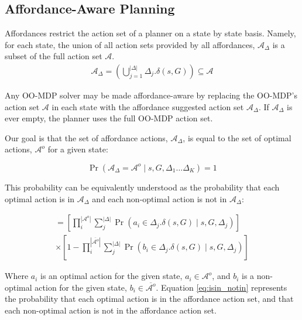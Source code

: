 \documentclass[conference]{IEEEtran}
\begin{document}
\subsection{Affordance-Aware Planning}
Affordances restrict the action set of a planner on a state by state basis. Namely, for each state, the union of all action sets provided by all affordances, $\mathcal{A}_{\Delta}$ is a subset of the full action set $\mathcal{A}$. 
\begin{align}
\mathcal{A}_{\Delta} = \left(\bigcup\limits_{j = 1}^{|\Delta|} \Delta_j.\delta(s,G) \right) \subseteq \mathcal{A}
\label{eq:afford_union}
\end{align}

Any OO-MDP solver may be made affordance-aware by replacing the OO-MDP's action set $\mathcal{A}$ in each state with the affordance suggested action set $\mathcal{A}_\Delta$. If $\mathcal{A}_\Delta$ is ever empty, the planner uses the full OO-MDP action set.

Our goal is that the set of affordance actions, $\mathcal{A}_{\Delta}$, is equal to the set of optimal actions, $\mathcal{A}^o$ for a given state:

\begin{equation} 
\Pr( \mathcal{A}_{\Delta} = \mathcal{A}^o \mid s, G, \Delta_1 \dots \Delta_K) = 1
\label{eq:opt}
\end{equation}

This probability can be equivalently understood as the probability that each
optimal action is in $\mathcal{A}_{\Delta}$ and each non-optimal action is not in $\mathcal{A}_{\Delta}$: %

\begin{multline}
= \left[\prod_i^{|\mathcal{A}^o|} \sum_j^{|\Delta|} \Pr(a_i \in \Delta_j.\delta(s,G) \mid s, G, \Delta_j)\right] \\
\times \left[1 - \prod_i^{|\overline{\mathcal{A}^o}|} \sum_j^{|\Delta|} \Pr(b_i \in \Delta_j.\delta(s,G) \mid s, G, \Delta_j)\right]
\label{eq:isin_notin}
\end{multline}

Where $a_i$ is an optimal action for the given state, $a_i \in \mathcal{A}^o$,
and $b_i$ is a non-optimal action for the given state, $b_i \in \overline{\mathcal{A}^o}$.
Equation \ref{eq:isin_notin} represents the probability that each optimal action is in the
affordance action set, and that each non-optimal action is not in the affordance action set.
\end{document}
